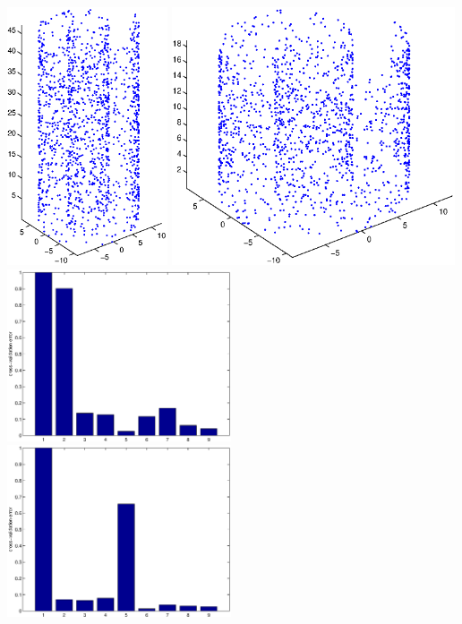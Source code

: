 \documentclass[12pt]{article}
\begin{document}
\centering
\includegraphics[height=3in]{swissroll1}
\includegraphics[height=3in]{swissroll2}\\
\includegraphics[height=2in]{swissroll1_cv}
\includegraphics[height=2in]{swissroll2_cv}\\
\end{document}
